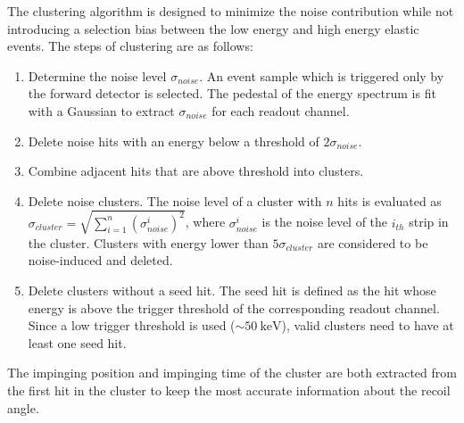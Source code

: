 \documentclass[number,5p]{elsarticle}
\begin{document}
The clustering algorithm is designed to minimize the noise contribution while
not introducing a selection bias between the low energy and high energy elastic events.
The steps of clustering are as follows:
\begin{enumerate}
\item Determine the noise level $\sigma_{noise}$. An event sample which is
  triggered only by the forward detector is selected.
  The pedestal of the energy spectrum is fit with a Gaussian to extract $\sigma_{noise}$ for each
  readout channel.
\item Delete noise hits with an energy below a threshold of $2\sigma_{noise}$.
\item Combine adjacent hits that are above threshold into clusters.
\item Delete noise clusters. The noise level of a cluster with $n$ hits is evaluated as
  $\sigma_{cluster} = \sqrt{\sum_{i=1}^n{(\sigma_{noise}^i)^2}}$, where $\sigma_{noise}^i$ is
  the noise level of the $i_{th}$ strip in the cluster. Clusters with energy lower than $5\sigma_{cluster}$ are considered to be noise-induced and deleted.
\item Delete clusters without a seed hit. The seed hit is defined as the
  hit whose energy is above the trigger threshold of the corresponding readout
  channel. Since a low trigger threshold is used ($\sim\SI{50}{\keV}$), valid clusters need to have at least one seed hit.
\end{enumerate}
The impinging position and impinging time of the cluster are both extracted from the first
hit in the cluster to keep the most accurate information about the recoil angle.
\end{document}
